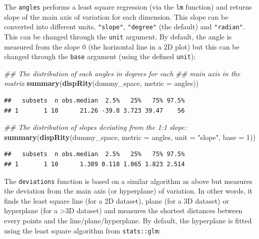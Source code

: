 \documentclass[
]{book}
\newenvironment{Shaded}{\begin{snugshade}}{\end{snugshade}}
\newcommand{\CommentTok}[1]{\textcolor[rgb]{0.56,0.35,0.01}{\textit{#1}}}
\newcommand{\DataTypeTok}[1]{\textcolor[rgb]{0.13,0.29,0.53}{#1}}
\newcommand{\DecValTok}[1]{\textcolor[rgb]{0.00,0.00,0.81}{#1}}
\newcommand{\KeywordTok}[1]{\textcolor[rgb]{0.13,0.29,0.53}{\textbf{#1}}}
\newcommand{\NormalTok}[1]{#1}
\newcommand{\StringTok}[1]{\textcolor[rgb]{0.31,0.60,0.02}{#1}}
\begin{document}
The \texttt{angles} performs a least square regression (via the \texttt{lm} function) and returns slope of the main axis of variation for each dimension. This slope can be converted into different units, \texttt{"slope"}, \texttt{"degree"} (the default) and \texttt{"radian"}. This can be changed through the \texttt{unit} argument.
By default, the angle is measured from the slope 0 (the horizontal line in a 2D plot) but this can be changed through the \texttt{base} argument (using the defined \texttt{unit}):

\begin{Shaded}
\begin{Highlighting}[]
\CommentTok{\#\# The distribution of each angles in degrees for each}
\CommentTok{\#\# main axis in the matrix}
\KeywordTok{summary}\NormalTok{(}\KeywordTok{dispRity}\NormalTok{(dummy\_space, }\DataTypeTok{metric =}\NormalTok{ angles))}
\end{Highlighting}
\end{Shaded}

\begin{verbatim}
##   subsets  n obs.median  2.5%   25%   75% 97.5%
## 1       1 10      21.26 -39.8 3.723 39.47    56
\end{verbatim}

\begin{Shaded}
\begin{Highlighting}[]
\CommentTok{\#\# The distribution of slopes deviating from the 1:1 slope:}
\KeywordTok{summary}\NormalTok{(}\KeywordTok{dispRity}\NormalTok{(dummy\_space, }\DataTypeTok{metric =}\NormalTok{ angles, }\DataTypeTok{unit =} \StringTok{"slope"}\NormalTok{,}
                 \DataTypeTok{base =} \DecValTok{1}\NormalTok{))}
\end{Highlighting}
\end{Shaded}

\begin{verbatim}
##   subsets  n obs.median  2.5%   25%   75% 97.5%
## 1       1 10      1.389 0.118 1.065 1.823 2.514
\end{verbatim}

The \texttt{deviations} function is based on a similar algorithm as above but measures the deviation from the main axis (or hyperplane) of variation.
In other words, it finds the least square line (for a 2D dataset), plane (for a 3D dataset) or hyperplane (for a \textgreater3D dataset) and measures the shortest distances between every points and the line/plane/hyperplane.
By default, the hyperplane is fitted using the least square algorithm from \texttt{stats::glm}:
\end{document}
